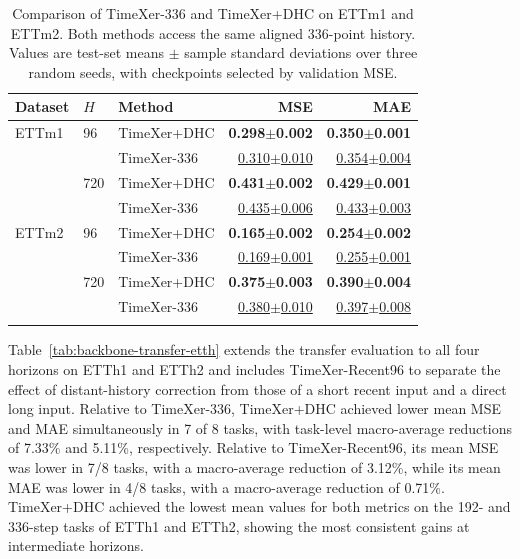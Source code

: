 \begin{table}[t]
\tablecaptionfont
\caption{Comparison of TimeXer-336 and TimeXer+DHC on ETTm1 and ETTm2. Both methods access the same aligned 336-point history. Values are test-set means $\pm$ sample standard deviations over three random seeds, with checkpoints selected by validation MSE.}
\label{tab:backbone-transfer}
\centering
\tablebodyfont
\setlength{\tabcolsep}{3pt}
\renewcommand{\arraystretch}{1.08}
\begin{tabular*}{\columnwidth}{@{\extracolsep{\fill}}lllrr@{}}
\toprule\noalign{}
Dataset & \(H\) & Method & MSE & MAE \\
\midrule\noalign{}
ETTm1 & 96 & TimeXer+DHC & \textbf{0.298$\pm$0.002} & \textbf{0.350$\pm$0.001} \\
& & TimeXer-336 & \underline{0.310$\pm$0.010} & \underline{0.354$\pm$0.004} \\
& 720 & TimeXer+DHC & \textbf{0.431$\pm$0.002} & \textbf{0.429$\pm$0.001} \\
& & TimeXer-336 & \underline{0.435$\pm$0.006} & \underline{0.433$\pm$0.003} \\
\midrule
ETTm2 & 96 & TimeXer+DHC & \textbf{0.165$\pm$0.002} & \textbf{0.254$\pm$0.002} \\
& & TimeXer-336 & \underline{0.169$\pm$0.001} & \underline{0.255$\pm$0.001} \\
& 720 & TimeXer+DHC & \textbf{0.375$\pm$0.003} & \textbf{0.390$\pm$0.004} \\
& & TimeXer-336 & \underline{0.380$\pm$0.010} & \underline{0.397$\pm$0.008} \\
\bottomrule\noalign{}
\end{tabular*}
\end{table}

Table~\ref{tab:backbone-transfer-etth} extends the transfer evaluation to all four horizons on ETTh1 and ETTh2 and includes TimeXer-Recent96 to separate the effect of distant-history correction from those of a short recent input and a direct long input. Relative to TimeXer-336, TimeXer+DHC achieved lower mean MSE and MAE simultaneously in 7 of 8 tasks, with task-level macro-average reductions of 7.33\% and 5.11\%, respectively. Relative to TimeXer-Recent96, its mean MSE was lower in 7/8 tasks, with a macro-average reduction of 3.12\%, while its mean MAE was lower in 4/8 tasks, with a macro-average reduction of 0.71\%. TimeXer+DHC achieved the lowest mean values for both metrics on the 192- and 336-step tasks of ETTh1 and ETTh2, showing the most consistent gains at intermediate horizons.

